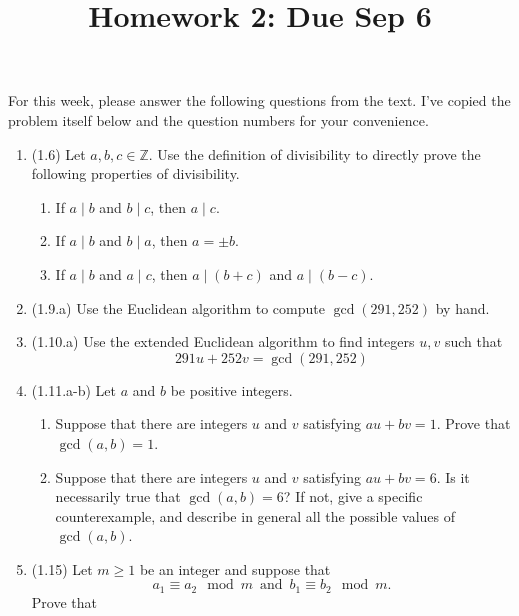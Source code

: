 \documentclass[12pt]{amsart}
\theoremstyle{definition}
\begin{document}
\title{Homework 2: Due Sep 6}

\maketitle

For this week, please answer the following questions from the text. 
I've copied the problem itself below and the question numbers for 
your convenience. 

\begin{enumerate}
	\item (1.6) Let $a,b,c \in \mathbb{Z}$. Use the definition of divisibility to directly prove
		the following properties of divisibility.
		\begin{enumerate}
			\item If $a \mid b$ and $b \mid c$, then $a \mid c$. 
			\item If $a \mid b$ and $b \mid a$, then $a = \pm b$.
			\item If $a \mid b$ and $a \mid c$, then $a \mid (b+c)$ and $a \mid (b-c)$.
		\end{enumerate}
	\item (1.9.a) Use the Euclidean algorithm to compute $\operatorname{gcd}(291,252)$ by hand. 
	\item (1.10.a) Use the extended Euclidean algorithm to find integers $u,v$ such that 
		\begin{displaymath}
			291u + 252v = \operatorname{gcd}(291,252)
		\end{displaymath}
	\item (1.11.a-b) Let $a$ and $b$ be positive integers. 
		\begin{enumerate}
			\item Suppose that there are integers $u$ and $v$ satisfying $au + bv = 1$. Prove 
			that $\operatorname{gcd}(a,b) = 1$. 
			\item Suppose that there are integers $u$ and $v$ satisfying $au + bv = 6$. Is 
				it necessarily true that $\operatorname{gcd}(a,b) = 6$? If not, give a 
				specific counterexample, and describe in general all the possible values 
				of $\operatorname{gcd}(a,b)$. 
		\end{enumerate}
	\item (1.15) Let $m \geq 1$ be an integer and suppose that 
		\begin{displaymath}
			a_1 \equiv a_2 \mod m \ \operatorname{and} \ b_1 \equiv b_2 \mod m.
		\end{displaymath}
		Prove that 
		\begin{displaymath}

\end{displaymath}
\end{enumerate}
\end{document}
